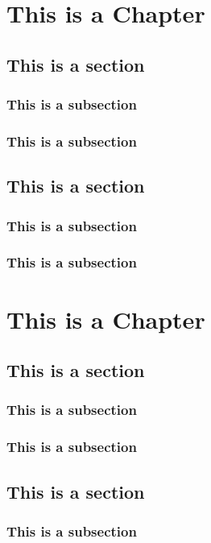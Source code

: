 \documentclass[palette=nighthill]{formatacao/classe-apostila}
\begin{document}
\chapter{This is a Chapter}
\section{This is a section}
\subsection{This is a subsection}
\lipsum[1-3]

\subsection{This is a subsection}
\lipsum[1-2]

\section{This is a section}
\subsection{This is a subsection}
\lipsum[1-1]
\subsection{This is a subsection}
\lipsum[1-2]

\chapter{This is a Chapter}
\section{This is a section}
\subsection{This is a subsection}
\lipsum[1-3]

\subsection{This is a subsection}
\lipsum[1-2]

\section{This is a section}
\subsection{This is a subsection}
\lipsum[1-1]
\end{document}
